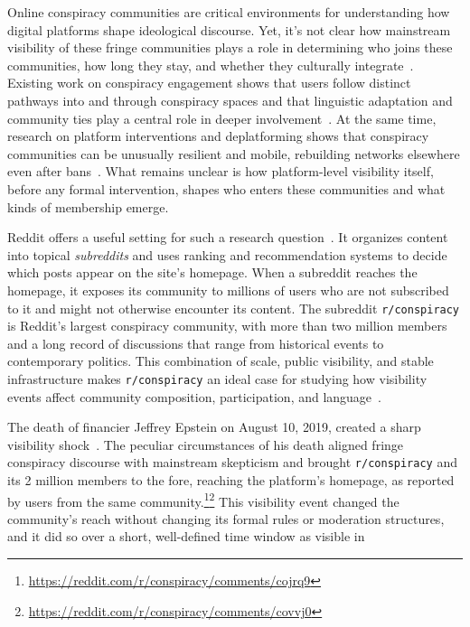 \documentclass[letterpaper]{article} %
\begin{document}
Online conspiracy communities are critical environments for understanding how digital platforms shape ideological discourse.
Yet, it's not clear how mainstream visibility of these fringe communities plays a role in determining who joins these communities, how long they stay, and whether they culturally integrate~\cite{klein_pathways_2019, phadke_pathways_2022, venturini_online_2022, zeng_conspiracy_2022,corso2025early}. 
Existing work on conspiracy engagement shows that users follow distinct pathways into and through conspiracy spaces and that linguistic adaptation and community ties play a central role in deeper involvement~\citep{klein_pathways_2019,phadke_pathways_2022}.
At the same time, research on platform interventions and deplatforming shows that conspiracy communities can be unusually resilient and mobile, rebuilding networks elsewhere even after bans~\citep{monti_online_2023}.
What remains unclear is how platform-level visibility itself, before any formal intervention, shapes who enters these communities and what kinds of membership emerge.

Reddit offers a useful setting for such a research question~\cite{proferes_studying_2021}.
It organizes content into topical \emph{subreddits} and uses ranking and recommendation systems to decide which posts appear on the site's homepage. 
When a subreddit reaches the homepage, it exposes its community to millions of users who are not subscribed to it and might not otherwise encounter its content. 
The subreddit \texttt{r/conspiracy} is Reddit's largest conspiracy community, with more than two million members and a long record of discussions that range from historical events to contemporary politics. 
This combination of scale, public visibility, and stable infrastructure makes \texttt{r/conspiracy} an ideal case for studying how visibility events affect community composition, participation, and language~\citep{de_wildt_participatory_2024}.

The death of financier Jeffrey Epstein on August 10, 2019, created a sharp visibility shock~\citep{schatto-eckrodt_seed_2024}. 
The peculiar circumstances of his death aligned fringe conspiracy discourse with mainstream skepticism and brought \texttt{r/conspiracy} and its 2 million members to the fore, reaching the platform's homepage, as reported by users from the same community.\footnote{\url{https://reddit.com/r/conspiracy/comments/cojrq9}}\footnote{\url{https://reddit.com/r/conspiracy/comments/covvj0}}
This visibility event changed the community's reach without changing its formal rules or moderation structures, and it did so over a short, well-defined time window as visible in 
\end{document}
